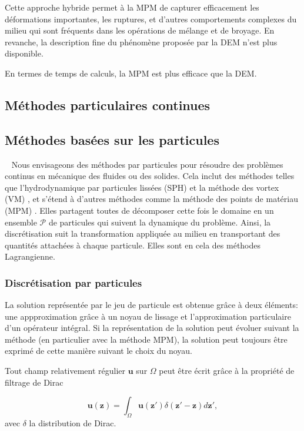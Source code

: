 Cette approche hybride permet à la MPM de capturer efficacement les déformations importantes, les ruptures, et d'autres comportements complexes du milieu qui sont fréquents dans les opérations de mélange et de broyage. En revanche, la description fine du phénomène proposée par la DEM n'est plus disponible.

En termes de temps de calculs, la MPM est plus efficace que la DEM.

\subsection{Méthodes particulaires continues}
\subsection{Méthodes basées sur les particules}~\label{Background_Part}
Nous envisageons des méthodes par particules pour résoudre des problèmes continus en mécanique des fluides ou des solides. Cela inclut des méthodes telles que l'hydrodynamique par particules lissées (SPH) \cite{lucy_1977gingold_monaghan_sph_1977} et la méthode des vortex (VM) \cite{cottet_vortex_2000}, et s'étend à d'autres méthodes comme la méthode des points de matériau (MPM) \cite{sulsky_particle_1994}. Elles partagent toutes de décomposer cette fois le domaine en un ensemble $\mathcal{P}$ de particules qui suivent la dynamique du problème. Ainsi, la discrétisation suit la transformation appliquée au milieu en transportant des quantités attachées à chaque particule. Elles sont en cela des méthodes Lagrangienne.

\subsubsection{Discrétisation par particules}

La solution représentée par le jeu de particule est obtenue grâce à deux éléments: une appproximation grâce à un noyau de lissage et l'approximation particulaire d'un opérateur intégral. Si la représentation de la solution peut évoluer suivant la méthode (en particulier avec la méthode MPM), la solution peut toujours être exprimé de cette manière suivant le choix du noyau.

Tout champ relativement régulier $\bm{u}$ sur $\Omega$ peut être écrit grâce à la propriété de filtrage de Dirac

\begin{equation*}
    \bm{u}(\bm{z}) = \int_{\Omega} \bm{u}(\bm{z'}) \delta(\bm{z'} - \bm{z})  d\bm{z'},
\end{equation*}avec $\delta$ la distribution de Dirac.

